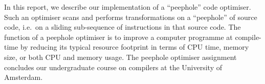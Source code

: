 In this report, we describe our implementation of a ``peephole'' code optimiser.
Such an optimiser scans and performs transformations on a ``peephole'' of source
code, i.e.\ on a sliding sub-sequence of instructions in that source code. The
function of a peephole optimiser is to improve a computer programme at
compile-time by reducing its typical resource footprint in terms of CPU time,
memory size, or both CPU and memory usage. The peephole optimiser assignment
concludes our undergraduate course on compilers at the University of Amsterdam.
